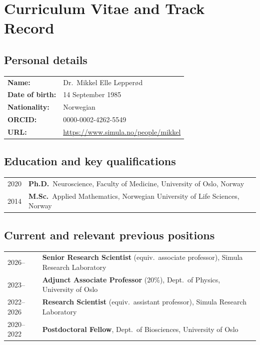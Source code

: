 
\newpage
\section{Curriculum Vitae and Track Record}

\subsection*{Personal details}

\begin{tabular}{ll}
\textbf{Name:} & Dr.\ Mikkel Elle Lepperød \\
\textbf{Date of birth:} & 14 September 1985 \\
\textbf{Nationality:} & Norwegian \\
\textbf{ORCID:} & 0000-0002-4262-5549 \\
\textbf{URL:} & \url{https://www.simula.no/people/mikkel} \\
\end{tabular}

\subsection*{Education and key qualifications}

\begin{tabular}{lp{12cm}}
2020 & \textbf{Ph.D.}\ Neuroscience, Faculty of Medicine, University of Oslo, Norway \\
2014 & \textbf{M.Sc.}\ Applied Mathematics, Norwegian University of Life Sciences, Norway \\
\end{tabular}

\subsection*{Current and relevant previous positions}

\begin{tabular}{lp{12cm}}
2026-- & \textbf{Senior Research Scientist} (equiv.\ associate professor), Simula Research Laboratory \\
2023-- & \textbf{Adjunct Associate Professor} (20\%), Dept.\ of Physics, University of Oslo \\
2022--2026 & \textbf{Research Scientist} (equiv.\ assistant professor), Simula Research Laboratory \\
2020--2022 & \textbf{Postdoctoral Fellow}, Dept.\ of Biosciences, University of Oslo \\
\end{tabular}


